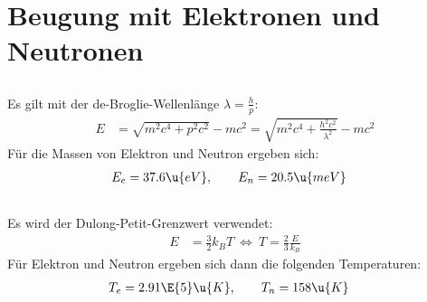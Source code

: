 \documentclass[exa]{exercise_5.0}
\begin{document}
\section{Beugung mit Elektronen und Neutronen}
\subsection{}
Es gilt mit der de-Broglie-Wellenlänge $\lambda = \frac{h}{p}$:
\begin{align*}
    E &= \sqrt{m^2 c^4 + p^2 c^2}- mc^2
    = \sqrt{m^2 c^4 + \frac{h^2 c^2}{\lambda^2}} - mc^2
\end{align*}
Für die Massen von Elektron und Neutron ergeben sich:
\begin{align*}
    E_e &= 37.6\u{eV},\qquad E_n = 20.5\u{meV}
\end{align*}

\subsection{}
Es wird der Dulong-Petit-Grenzwert verwendet: 
\begin{align*}
    E &= \frac32 k_B T \ \Leftrightarrow \ T = \frac23 \frac{E}{k_B}
\end{align*}
Für Elektron und Neutron ergeben sich dann die folgenden Temperaturen:
\begin{align*}
    T_e &= 2.91\E{5}\u{K},\qquad T_n = 158\u{K}
\end{align*}


\end{document}
